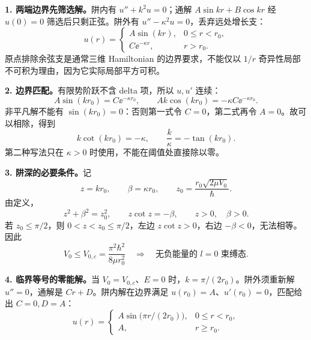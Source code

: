 \begin{checkedsolution}
\textbf{1. 两端边界先筛选解。}阱内有 $u''+k^2u=0$；通解 $A\sin kr+B\cos kr$ 经 $u(0)=0$ 筛选后只剩正弦。阱外有 $u''-\kappa^2u=0$，丢弃远处增长支：
\begin{equation}
  \boxed{u(r)=\begin{cases}
    A\sin(kr),&0\leq r<r_0,\\
    C\ee^{-\kappa r},&r>r_0.
  \end{cases}}
\end{equation}
原点排除余弦支是通常三维 Hamiltonian 的边界要求，不能仅以 $1/r$ 奇异性局部不可积为理由，因为它实际局部平方可积。

\textbf{2. 边界匹配。}有限势阶跃不含 delta 项，所以 $u,u'$ 连续：
\begin{equation}
  A\sin(kr_0)=C\ee^{-\kappa r_0},\qquad
  Ak\cos(kr_0)=-\kappa C\ee^{-\kappa r_0}.
\end{equation}
非平凡解不能有 $\sin(kr_0)=0$：否则第一式令 $C=0$，第二式再令 $A=0$。故可以相除，得到
\begin{equation}
  \boxed{k\cot(kr_0)=-\kappa,\qquad
    \frac{k}{\kappa}=-\tan(kr_0).}
\end{equation}
第二种写法只在 $\kappa>0$ 时使用，不能在阈值处直接除以零。

\textbf{3. 阱深的必要条件。}记
\begin{equation}
  z=kr_0,\qquad \beta=\kappa r_0,\qquad
  z_0=\frac{r_0\sqrt{2\mu V_0}}\hbar.
\end{equation}
由定义，
\begin{equation}
  z^2+\beta^2=z_0^2,\qquad z\cot z=-\beta,
  \qquad z>0,\quad\beta>0.
\end{equation}
若 $z_0\leq\pi/2$，则 $0<z<z_0\leq\pi/2$，左边 $z\cot z>0$，右边 $-\beta<0$，无法相等。因此
\begin{equation}
  \boxed{V_0\leq V_{0,c}=\frac{\pi^2\hbar^2}{8\mu r_0^2}
    \quad\Longrightarrow\quad\text{无负能量的 }l=0\text{ 束缚态}.}
\end{equation}

\textbf{4. 临界等号的零能解。}当 $V_0=V_{0,c}$、$E=0$ 时，$k=\pi/(2r_0)$。阱外须重新解 $u''=0$，通解是 $Cr+D$。阱内解在边界满足 $u(r_0)=A$、$u'(r_0)=0$，匹配给出 $C=0,D=A$：
\begin{equation}
  \boxed{u(r)=\begin{cases}
    A\sin\bigl(\pi r/(2r_0)\bigr),&0\leq r<r_0,\\
    A,&r\geq r_0.
  \end{cases}}
\end{equation}


\end{checkedsolution}
